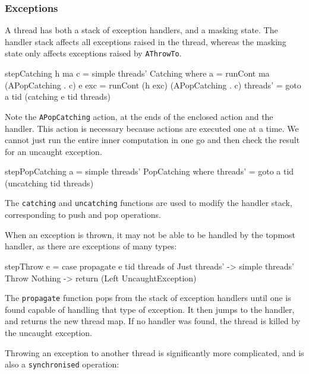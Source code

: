\subsubsection{Exceptions}
\label{sec:execution-stepwise-exception}

A thread has both a stack of exception handlers, and a masking
state. The handler stack affects all exceptions raised in the thread,
whereas the masking state only affects exceptions raised by
\verb|AThrowTo|.

\begin{haskellcode}
stepCatching h ma c = simple threads' Catching where
  a     = runCont ma      (APopCatching . c)
  e exc = runCont (h exc) (APopCatching . c)
  threads' = goto a tid (catching e tid threads)
\end{haskellcode}

Note the \verb|APopCatching| action, at the ends of the enclosed
action and the handler. This action is necessary because actions are
executed one at a time. We cannot just run the entire inner
computation in one go and then check the result for an uncaught
exception.

\begin{haskellcode}
stepPopCatching a = simple threads' PopCatching where
  threads' = goto a tid (uncatching tid threads)
\end{haskellcode}

The \verb|catching| and \verb|uncatching| functions are used to modify
the handler stack, corresponding to push and pop operations.

When an exception is thrown, it may not be able to be handled by the
topmost handler, as there are exceptions of many types:

\begin{haskellcode}
stepThrow e = case propagate e tid threads of
    Just threads' -> simple threads' Throw
    Nothing -> return (Left UncaughtException)
\end{haskellcode}

The \verb|propagate| function pops from the stack of exception
handlers until one is found capable of handling that type of
exception. It then jumps to the handler, and returns the new thread
map. If no handler was found, the thread is killed by the uncaught
exception.

Throwing an exception to another thread is significantly more
complicated, and is also a \verb|synchronised| operation:


